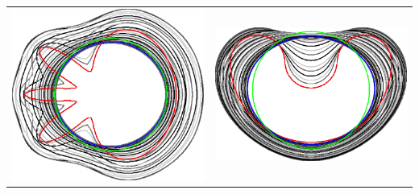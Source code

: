 \begin{frame}
{\begin{tabular}{cc}
\includegraphics[scale=0.12]{figures/graphcut/with-neighborhood-flow/radius_16/flower.png}\hspace{3em} &
\includegraphics[scale=0.12]{figures/graphcut/with-neighborhood-flow/radius_16/bean.png}
\end{tabular}}
\end{frame}


